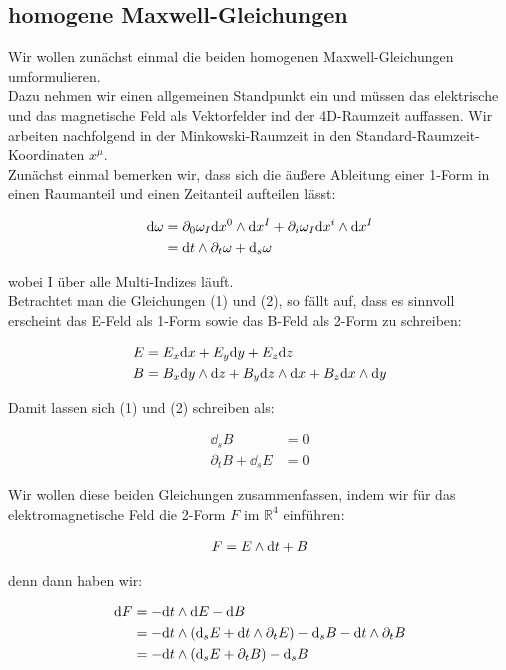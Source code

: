 \subsection{homogene Maxwell-Gleichungen}
Wir wollen zunächst einmal die beiden homogenen Maxwell-Gleichungen umformulieren. \\
Dazu nehmen wir einen allgemeinen Standpunkt ein und müssen das elektrische und das magnetische Feld als Vektorfelder ind der 4D-Raumzeit auffassen. Wir arbeiten nachfolgend in der Minkowski-Raumzeit in den Standard-Raumzeit-Koordinaten $x^{\mu}$. \\
Zunächst einmal bemerken wir, dass sich die äußere Ableitung einer 1-Form in einen Raumanteil und einen Zeitanteil aufteilen lässt:

\begin{align}
\dd \omega &= \partial_0 \omega_I \dd x^0 \wedge \dd x^{I} + \partial_i \omega_I \dd x^i \wedge \dd x^{I} \\
&= \dd t \wedge \partial_t \omega + \dd_s \omega 
\end{align}

wobei I über alle Multi-Indizes läuft. \\
Betrachtet man die Gleichungen (1) und (2), so fällt auf, dass es sinnvoll erscheint das E-Feld als 1-Form sowie das B-Feld als 2-Form zu schreiben:

\begin{align}
E &= E_x \dd x +E_y \dd y + E_z \dd z   \\
B &= B_x \dd y \wedge \dd z + B_y \dd z \wedge \dd x + B_z \dd x \wedge \dd y 
\end{align}

Damit lassen sich (1) und (2) schreiben als:

\begin{align}
\dd_s B &= 0 \\
\partial_t B + \dd_s E &=0
\end{align}

Wir wollen diese beiden Gleichungen zusammenfassen, indem wir für das elektromagnetische Feld die 2-Form $F$ im $\mathbb{R}^4$ einführen:

\begin{align}  
F= E \wedge \dd t + B 
\end{align} 

denn dann haben wir:

\begin{align}
\dd F &= - \dd t \wedge \dd E - \dd B \notag \\
		&= - \dd t \wedge (\dd_s E + \dd t \wedge \partial_t E ) - \dd_s B - \dd t \wedge \partial_t B \notag \\
		&= -\dd t \wedge (\dd_s E + \partial_t B) - \dd_s B
\end{align}

